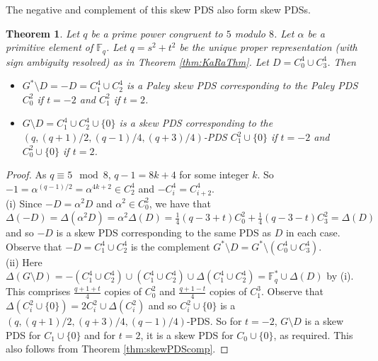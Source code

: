 \documentclass[12pt, a4paper]{article}
\newtheorem{theorem}{Theorem}[section]
\theoremstyle{definition}
\begin{document}
The negative and complement of this skew PDS also form skew PDSs.
\begin{theorem}
Let $q$ be a prime power congruent to $5$ modulo $8$. Let $\alpha$ be a primitive element of $\mathbb{F}_q$. Let $q=s^2+t^2$ be the unique proper representation (with sign ambiguity resolved) as in Theorem \ref{thm:KaRaThm}. Let $D=C_0^4 \cup C_3^4$.  Then
\begin{itemize}
\item[(i)] $G^* \setminus D=-D=C_1^4 \cup C_2^4$ is a Paley skew PDS corresponding to the Paley PDS $C_0^2$ if $t=-2$ and $C_1^2$ if $t=2$.
\item[(ii)] $G \setminus D = C_1^4 \cup C_2^4 \cup \{0\}$ is a skew PDS corresponding to the $(q,(q+1)/2,(q-1)/4,(q+3)/4)$-PDS $C_1^2 \cup \{0\}$ if $t=-2$ and $C_0^2 \cup \{0\}$ if $t=2$.
\end{itemize}
\end{theorem}
\begin{proof}
As $q \equiv 5 \mod 8$, $q-1=8k+4$ for some integer $k$.  So $-1=\alpha^{(q-1)/2}=\alpha^{4k+2} \in C_2^4$ and $-C_i^4=C_{i+2}^4$. \\
(i) Since $-D=\alpha^2 D$ and $\alpha^2 \in C_0^2$, we have that $\Delta(-D)=\Delta(\alpha^2 D)=\alpha^2 \Delta(D)=\frac{1}{4}(q-3+t)C_0^2 + \frac{1}{4}(q-3-t)C_3^2=\Delta(D)$ and so $-D$ is a skew PDS corresponding to the same PDS as $D$ in each case.  Observe that $-D=C_1^4 \cup C_2^4$ is the complement $G^* \setminus D= G^* \setminus (C_0^4 \cup C_3^4)$.\\
(ii) Here $\Delta(G \setminus D)=-(C_1^4 \cup C_2^4) \cup (C_1^4 \cup C_2^4) \cup \Delta(C_1^4 \cup C_2^4)=\mathbb{F}_q^* \cup \Delta(D)$ by (i).  This comprises $\frac{q+1+t}{4}$ copies of $C_0^2$ and $\frac{q+1-t}{4}$ copies of $C_1^3$.  Observe that $\Delta(C_i^2 \cup \{0\})=2C_i^2 \cup \Delta(C_i^2)$ and so $C_i^2 \cup \{0\}$ is a $(q,(q+1)/2, (q+3)/4,(q-1)/4)$-PDS.  So for $t=-2$, $G \setminus D$ is a skew PDS for $C_1 \cup \{0\}$ and for $t=2$, it is a skew PDS for $C_0 \cup \{0\}$, as required. This also follows from Theorem \ref{thm:skewPDScomp}.
\end{proof}
\end{document}
